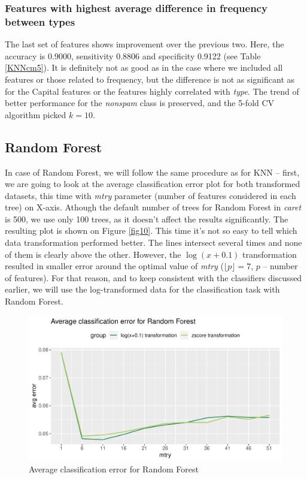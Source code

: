 \documentclass{article}\usepackage[]{graphicx}\usepackage[]{xcolor}
\makeatletter
\def\maxwidth{ %
  \ifdim\Gin@nat@width>\linewidth
    \linewidth
  \else
    \Gin@nat@width
  \fi
}
\newenvironment{knitrout}{}{} %
\makeatother
\begin{document}
\subsubsection*{Features with highest average difference in frequency between types}

The last set of features shows improvement over the previous two. Here, the accuracy is 0.9000,
sensitivity 0.8806 and specificity 0.9122 (see Table \ref{KNNcm5}). It is definitely not as good as in the case 
where we included all features or those related to frequency, but the difference is
not as significant as for the Capital features or the features highly correlated with \textit{type}.
The trend of better performance for the \textit{nonspam} class is preserved, and the 5-fold CV algorithm picked $k=10$.


\subsection*{Random Forest}

In case of Random Forest, we will follow the same procedure as for KNN -- first, 
we are going to look at the average classification error plot for both transformed
datasets, this time with \textit{mtry} parameter (number of features considered in each tree) on X-axis.
Athough the default number of trees for Random Forest in \textit{caret} is 500, we use only
100 trees, as it doesn't affect the results significantly.
The resulting plot is shown on Figure \ref{fig10}. This time it's not so easy to tell which data transformation
performed better. The lines intersect several times and none of them is clearly above the other.
However, the $\log(x+0.1)$ transformation resulted in smaller error around the
optimal value of \textit{mtry} ($\lfloor p \rfloor = 7$, $p$ -- number of features).
For that reason, and to keep consistent with the classifiers discussed earlier, 
we will use the log-transformed data for the classification task with Random Forest.

\begin{knitrout}
\color{fgcolor}\begin{figure}[h]
\includegraphics[width=\maxwidth]{figure/avgErrRF-1} \caption[\label{fig10} Average classification error for Random Forest]{\label{fig10} Average classification error for Random Forest}\label{fig:avgErrRF}
\end{figure}

\end{knitrout}
\end{document}
